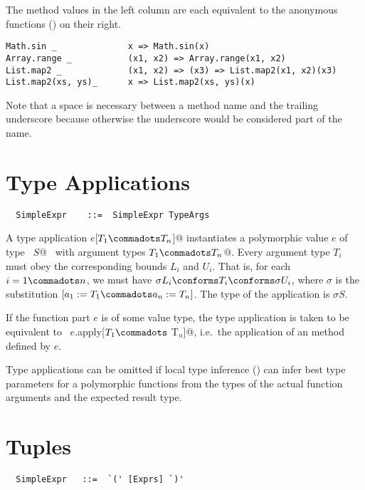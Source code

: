 \example The method values in the left column are each equivalent to the 
anonymous functions () on their right.

\begin{lstlisting}
Math.sin _              x => Math.sin(x)
Array.range _           (x1, x2) => Array.range(x1, x2)
List.map2 _             (x1, x2) => (x3) => List.map2(x1, x2)(x3)
List.map2(xs, ys)_      x => List.map2(xs, ys)(x)
\end{lstlisting}

Note that a space is necessary between a method name and the trailing underscore
because otherwise the underscore would be considered part of the name.  

\section{Type Applications}
\label{sec:type-app}
\syntax\begin{lstlisting}
  SimpleExpr    ::=  SimpleExpr TypeArgs
\end{lstlisting}

A type application \lstinline@$e$[$T_1 \commadots T_n$]@ instantiates
a polymorphic value $e$ of type ~\lstinline@[$a_1$ >: $L_1$ <: $U_1
\commadots a_n$ >: $L_n$ <: $U_n$]$S$@~ with argument types
\lstinline@$T_1 \commadots T_n$@.  Every argument type $T_i$ must obey
the corresponding bounds $L_i$ and $U_i$.  That is, for each $i = 1
\commadots n$, we must have $\sigma L_i \conforms T_i \conforms \sigma
U_i$, where $\sigma$ is the substitution $[a_1 := T_1 \commadots a_n
:= T_n]$.  The type of the application is $\sigma S$.

If the function part $e$ is of some value type, the type application
is taken to be equivalent to 
~\lstinline@$e$.apply[$T_1 \commadots$ T$_n$]@, i.e.\ the application of an  method defined by
$e$.

Type applications can be omitted if local type inference
() can infer best type parameters for a
polymorphic functions from the types of the actual function arguments
and the expected result type.

\section{Tuples}
\label{sec:tuples}

\syntax\begin{lstlisting}
  SimpleExpr   ::=  `(' [Exprs] `)'
\end{lstlisting}

